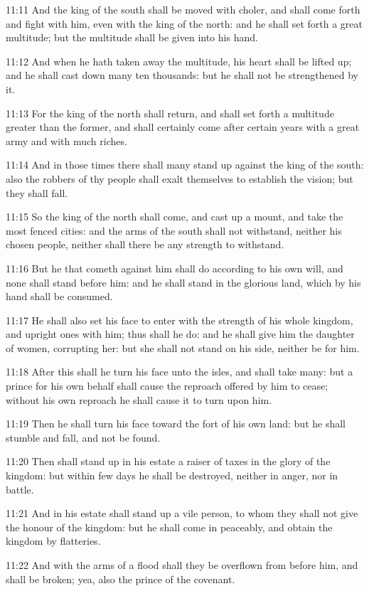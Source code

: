 11:11 And the king of the south shall be moved with choler, and shall come forth and fight with him, even with the king of the north: and he shall set forth a great multitude; but the multitude shall be given into his hand.

11:12 And when he hath taken away the multitude, his heart shall be lifted up; and he shall cast down many ten thousands: but he shall not be strengthened by it.

11:13 For the king of the north shall return, and shall set forth a multitude greater than the former, and shall certainly come after certain years with a great army and with much riches.

11:14 And in those times there shall many stand up against the king of the south: also the robbers of thy people shall exalt themselves to establish the vision; but they shall fall.

11:15 So the king of the north shall come, and cast up a mount, and take the most fenced cities: and the arms of the south shall not withstand, neither his chosen people, neither shall there be any strength to withstand.

11:16 But he that cometh against him shall do according to his own will, and none shall stand before him: and he shall stand in the glorious land, which by his hand shall be consumed.

11:17 He shall also set his face to enter with the strength of his whole kingdom, and upright ones with him; thus shall he do: and he shall give him the daughter of women, corrupting her: but she shall not stand on his side, neither be for him.

11:18 After this shall he turn his face unto the isles, and shall take many: but a prince for his own behalf shall cause the reproach offered by him to cease; without his own reproach he shall cause it to turn upon him.

11:19 Then he shall turn his face toward the fort of his own land: but he shall stumble and fall, and not be found.

11:20 Then shall stand up in his estate a raiser of taxes in the glory of the kingdom: but within few days he shall be destroyed, neither in anger, nor in battle.

11:21 And in his estate shall stand up a vile person, to whom they shall not give the honour of the kingdom: but he shall come in peaceably, and obtain the kingdom by flatteries.

11:22 And with the arms of a flood shall they be overflown from before him, and shall be broken; yea, also the prince of the covenant.

